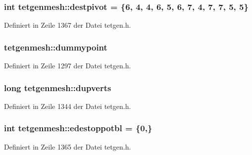 \hypertarget{classtetgenmesh_a213a06f8f39654014405e4add71073d3}{
\subsubsection[{destpivot}]{\setlength{\rightskip}{0pt plus 5cm}int tetgenmesh\-::destpivot = \{6, 4, 4, 6, 5, 6, 7, 4, 7, 7, 5, 5\}\hspace{0.3cm}{\ttfamily [static]}}}\label{classtetgenmesh_a213a06f8f39654014405e4add71073d3}


Definiert in Zeile 1367 der Datei tetgen.\-h.

\hypertarget{classtetgenmesh_a5b9c064585da367f7e2629ef7985be29}{
\subsubsection[{dummypoint}]{ tetgenmesh\-::dummypoint}}\label{classtetgenmesh_a5b9c064585da367f7e2629ef7985be29}


Definiert in Zeile 1297 der Datei tetgen.\-h.

\hypertarget{classtetgenmesh_a968eeccaf5784dba3596b4ddcb96b022}{
\subsubsection[{dupverts}]{\setlength{\rightskip}{0pt plus 5cm}long tetgenmesh\-::dupverts}}\label{classtetgenmesh_a968eeccaf5784dba3596b4ddcb96b022}


Definiert in Zeile 1344 der Datei tetgen.\-h.

\hypertarget{classtetgenmesh_a958c01959dff786bf047d2f270849ffa}{
\subsubsection[{edestoppotbl}]{\setlength{\rightskip}{0pt plus 5cm}int tetgenmesh\-::edestoppotbl = \{0,\}\hspace{0.3cm}{\ttfamily [static]}}}\label{classtetgenmesh_a958c01959dff786bf047d2f270849ffa}


Definiert in Zeile 1365 der Datei tetgen.\-h.

